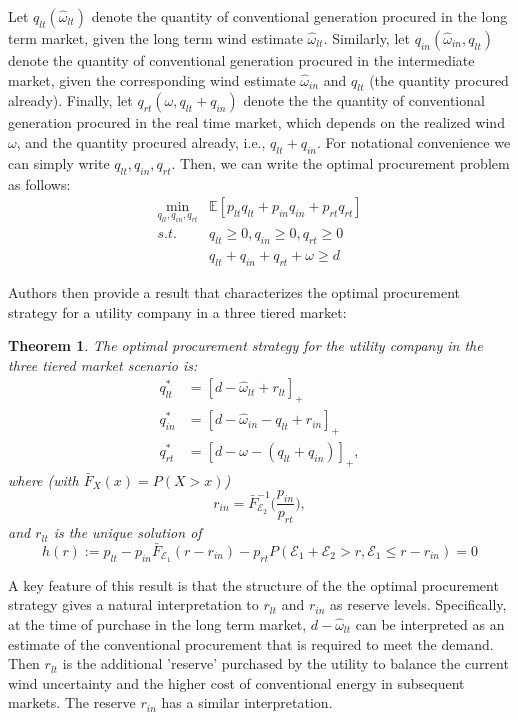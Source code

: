 \documentclass{article}
\newtheorem{theorem}{Theorem}
\begin{document}
Let $q_{lt}(\hat{\omega}_{lt})$ denote the quantity of conventional generation procured in the long term market, given the long term wind estimate $\hat{\omega}_{lt}$. Similarly, let $q_{in}(\hat{\omega}_{in}, q_{lt})$ denote the quantity of conventional generation procured in the intermediate market, given the corresponding wind estimate $\hat{\omega}_{in}$ and $q_{lt}$ (the quantity procured already). Finally, let $q_{rt}(\omega, q_{lt} + q_{in})$ denote the the quantity of conventional generation procured in the real time market, which depends on the realized wind $\omega$, and the quantity procured already, i.e., $q_{lt} + q_{in}$. For notational convenience we can simply write $q_{lt}, q_{in}, q_{rt}$. Then, we can write the optimal procurement problem as follows:
\begin{align*}
    \min_{q_{lt}, q_{in}, q_{rt}} &\mathbb{E}[p_{lt} q_{lt} + p_{in} q_{in} + p_{rt} q_{rt}]\\
    s.t.\quad & q_{lt} \geq 0, q_{in} \geq 0, q_{rt} \geq 0\\
    & q_{lt} + q_{in} + q_{rt} + \omega \geq d
\end{align*}

Authors then provide a result that characterizes the optimal procurement strategy for a utility company in a three tiered market:
\begin{theorem}
    The optimal procurement strategy for the utility company in the three tiered market scenario is:
    \begin{align*}
        q^{\ast}_{lt} &= [d - \hat{\omega}_{lt} + r_{lt}]_+ \\
        q^{\ast}_{in} &= [d - \hat{\omega}_{in} - q_{lt} + r_{in}]_+ \\
        q^{\ast}_{rt} &= [d - \omega - (q_{lt} + q_{in})]_+,
    \end{align*}
    where (with $\bar{F}_X(x) = P(X > x)$)
    \begin{equation*}
        r_{in} = \bar{F}^{-1}_{\mathcal{E}_2} \big( \frac{p_{in}}{p_{rt}} \big),
    \end{equation*}
    and $r_{lt}$ is the unique solution of
    \begin{equation*}
        h(r) := p_{lt} - p_{in} \bar{F}_{\mathcal{E}_1} (r - r_{in}) - p_{rt} P(\mathcal{E}_1 + \mathcal{E}_2 > r, \mathcal{E}_1 \leq r - r_{in}) = 0
    \end{equation*}
\end{theorem}
A key feature of this result is that the structure of the the optimal procurement strategy gives a natural interpretation to $r_{lt}$ and $r_{in}$ as reserve levels. Specifically, at the time of purchase in the long term market, $d - \hat{\omega}_{lt}$ can be interpreted as an estimate of the conventional procurement that is required to meet the demand. Then $r_{lt}$ is the additional 'reserve' purchased by the utility to balance the current wind uncertainty and the higher cost of conventional energy in subsequent markets. The reserve $r_{in}$ has a similar interpretation.
\end{document}
